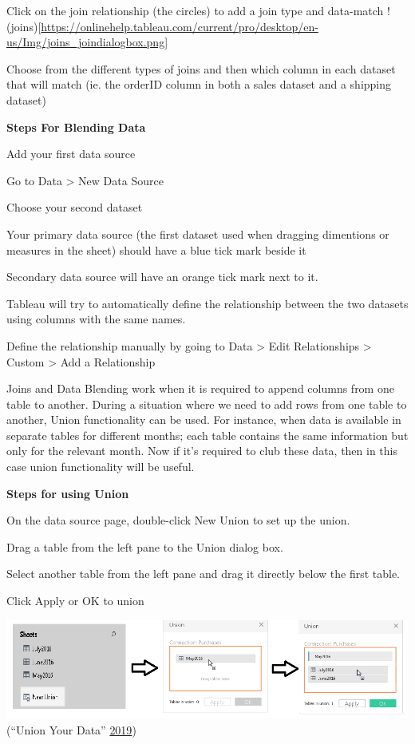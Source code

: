 \documentclass[]{book}
\begin{document}
Click on the join relationship (the circles) to add a join type and data-match
!(joins){[}\url{https://onlinehelp.tableau.com/current/pro/desktop/en-us/Img/joins_joindialogbox.png}{]}

Choose from the different types of joins and then which column in each dataset that will match (ie. the orderID column in both a sales dataset and a shipping dataset)

\textbf{Steps For Blending Data}

Add your first data source

Go to Data \textgreater{} New Data Source

Choose your second dataset

Your primary data source (the first dataset used when dragging dimentions or measures in the sheet) should have a blue tick mark beside it

Secondary data source will have an orange tick mark next to it.

Tableau will try to automatically define the relationship between the two datasets using columns with the same names.

Define the relationship manually by going to Data \textgreater{} Edit Relationships \textgreater{} Custom \textgreater{} Add a Relationship

Joins and Data Blending work when it is required to append columns from one table to another. During a situation where we need to add rows from one table to another, Union functionality can be used. For instance, when data is available in separate tables for different months; each table contains the same information but only for the relevant month. Now if it's required to club these data, then in this case union functionality will be useful.

\textbf{Steps for using Union}

On the data source page, double-click New Union to set up the union.

Drag a table from the left pane to the Union dialog box.

Select another table from the left pane and drag it directly below the first table.

Click Apply or OK to union

\includegraphics{images/Tableau_Union.png}
(``Union Your Data'' \protect\hyperlink{ref-Tableau_Union}{2019})
\end{document}
